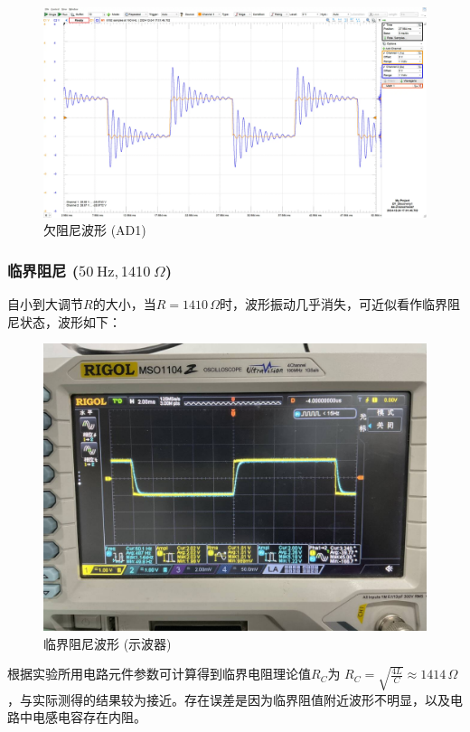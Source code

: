 \documentclass[UTF8]{article}
\theoremstyle{MyLineTheoremStyle} %
\theoremstyle{MyBlockTheoremStyle} %
\theoremstyle{MySubsubsectionStyle} %
\begin{document}
\begin{figure}[H]\centering
    \includegraphics[width=0.9\columnwidth]{assets/3/20241224 RLC 实验, RLC 暂态, 50Hz 0 Ohm 欠阻尼.png}
    \caption{欠阻尼波形 (AD1)}
\end{figure}

\subsubsection{临界阻尼 ($ 50\ \mathrm{Hz}, 1410 \ \Omega$)}

自小到大调节$ R $的大小，当$ R=1410\,\Omega $时，波形振动几乎消失，可近似看作临界阻尼状态，波形如下：
\begin{figure}[H]\centering
    \includegraphics[width=0.9\columnwidth]{assets/3/de9a909a297bc9eb880b069c61728fab_720.png}
    \caption{临界阻尼波形 (示波器)}
\end{figure}

根据实验所用电路元件参数可计算得到临界电阻理论值$ R_C $为 $R_C=\sqrt{\frac{4L}{C}}\approx1414\,\Omega$，与实际测得的结果较为接近。存在误差是因为临界阻值附近波形不明显，以及电路中电感电容存在内阻。
\end{document}
